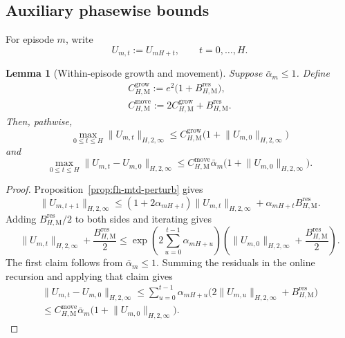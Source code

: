 \documentclass{article}
\newtheorem{lemma}[theorem]{Lemma}
\begin{document}
\subsection{Auxiliary phasewise bounds}

For episode $m$, write
\begin{equation}
U_{m,t}:=U_{mH+t},\qquad t=0,\dots,H.
\end{equation}

\begin{lemma}[Within-episode growth and movement]
\label{lem:fh-mtd-within}
Suppose $\bar\alpha_m\le1$. Define
\begin{equation}
\begin{gathered}
C_{H,\mathrm M}^{\mathrm{grow}}:=e^2\bigl(1+B_{H,\mathrm M}^{\mathrm{res}}\bigr),\\
C_{H,\mathrm M}^{\mathrm{move}}:=2C_{H,\mathrm M}^{\mathrm{grow}}+B_{H,\mathrm M}^{\mathrm{res}}.
\end{gathered}
\end{equation}
Then, pathwise,
\begin{equation}
\max_{0\le t\le H}\lVert U_{m,t}\rVert_{H,2,\infty}\le C_{H,\mathrm M}^{\mathrm{grow}}\bigl(1+\lVert U_{m,0}\rVert_{H,2,\infty}\bigr)
\end{equation}
and
\begin{equation}
\max_{0\le t\le H}\lVert U_{m,t}-U_{m,0}\rVert_{H,2,\infty}\le C_{H,\mathrm M}^{\mathrm{move}}\bar\alpha_m\bigl(1+\lVert U_{m,0}\rVert_{H,2,\infty}\bigr).
\end{equation}
\end{lemma}

\begin{proof}
Proposition~\ref{prop:fh-mtd-perturb} gives
\begin{equation}
\lVert U_{m,t+1}\rVert_{H,2,\infty}\le(1+2\alpha_{mH+t})\lVert U_{m,t}\rVert_{H,2,\infty}+\alpha_{mH+t}B_{H,\mathrm M}^{\mathrm{res}}.
\end{equation}
Adding $B_{H,\mathrm M}^{\mathrm{res}}/2$ to both sides and iterating gives
\begin{equation}
\lVert U_{m,t}\rVert_{H,2,\infty}+\frac{B_{H,\mathrm M}^{\mathrm{res}}}{2}\le\exp\left(2\sum_{u=0}^{t-1}\alpha_{mH+u}\right)\left(\lVert U_{m,0}\rVert_{H,2,\infty}+\frac{B_{H,\mathrm M}^{\mathrm{res}}}{2}\right).
\end{equation}
The first claim follows from $\bar\alpha_m\le1$. Summing the residuals in the online recursion and applying that claim gives
\begin{equation}
\begin{gathered}
\lVert U_{m,t}-U_{m,0}\rVert_{H,2,\infty}\le\sum_{u=0}^{t-1}\alpha_{mH+u}\bigl(2\lVert U_{m,u}\rVert_{H,2,\infty}+B_{H,\mathrm M}^{\mathrm{res}}\bigr)\\
\le C_{H,\mathrm M}^{\mathrm{move}}\bar\alpha_m\bigl(1+\lVert U_{m,0}\rVert_{H,2,\infty}\bigr).
\end{gathered}
\end{equation}
\end{proof}
\end{document}
